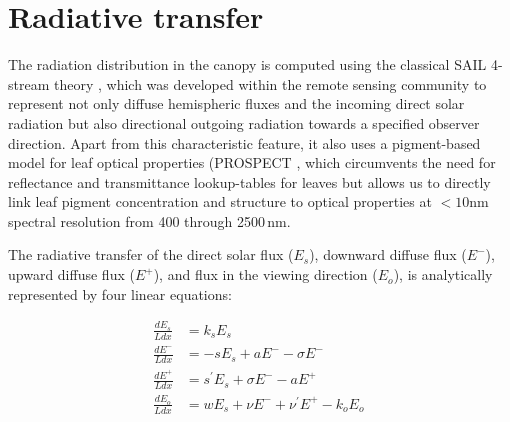 \documentclass[twoside,10pt]{report}
\begin{document}
\section{Radiative transfer}

The radiation distribution in the canopy is computed using the classical SAIL 4-stream theory \citep{Verhoef1984}, which was developed within the remote sensing community to represent not only diffuse hemispheric fluxes and the incoming direct solar radiation but also directional outgoing radiation towards a specified observer direction. Apart from this characteristic feature, it also uses a pigment-based model for leaf optical properties (PROSPECT \citep{Jacquemoud1990, Jacquemoud2009}, which circumvents the need for reflectance and transmittance lookup-tables for leaves but allows us to directly link leaf pigment concentration and structure to optical properties at $<10$nm spectral resolution from 400 through 2500\,nm. 

The radiative transfer of the direct solar flux ($E_s$), downward diffuse flux ($E^{-}$), upward diffuse flux ($E^{+}$), and flux in the viewing direction ($E_o$), is analytically represented by four linear equations: 

 \begin{align} 
 \frac{d E_s}{L dx} & = k_s E_s\\
\label{radiative_transfer:direct_solar_flux}
 \frac{d E^-}{L dx} & = -s E_s + a E^- - \sigma E^- \\
\label{radiative_transfer:downward_diffuse_flux}
 \frac{d E^+}{L dx} & = s^\prime E_s + \sigma E^- - a E^+ \\
\label{radiative_transfer:upward_diffuse_flux}
 \frac{d E_o}{L dx} & = w E_s + \nu E^- + \nu^\prime E^+ - k_o E_o\,
\label{radiative_transfer:flux_viewing_direction}
\end{align}
\end{document}
